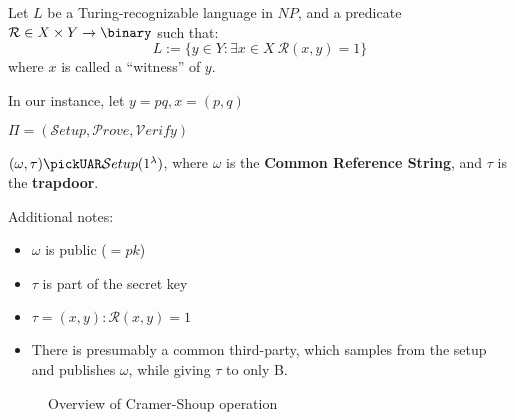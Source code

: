 Let $L$ be a Turing-recognizable language in $NP$, and a predicate $\mathcal{R} \in X \times Y \to \binary$ such that:
\begin{equation*}
    L := \{y \in Y : \exists x \in X \: \mathcal{R}(x, y) = 1\}
\end{equation*}
where $x$ is called a ``witness'' of $y$.

In our instance, let $y = pq, x = (p,q)$

$\Pi = (\mathcal{S}etup, \mathcal{P}rove, \mathcal{V}erify)$

$(\omega, \tau) \pickUAR \mathcal{S}etup(1^\lambda)$, where $\omega$ is the \textbf{Common Reference String}, and $\tau$ is the \textbf{trapdoor}.

Additional notes:
\begin{itemize}
    \item $\omega$ is public ($ = pk$)
    \item $\tau$ is part of the secret key
    \item $\tau = (x, y) : \mathcal{R}(x, y) = 1$ %
    \item There is presumably a common third-party, which samples from the setup and publishes $\omega$, while giving $\tau$ to only B. %
\end{itemize}

\begin{figure}[h!]
    \centering
    \sdinit{}
    \caption{Overview of Cramer-Shoup operation}
    \label{seq:csoverview}
\end{figure}

